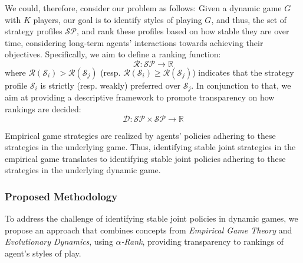         \noindent
        We could, therefore, consider our problem as follows: Given a dynamic game $G$ with $K$ players, our goal is to identify styles of playing $G$, and thus, the set of strategy profiles $\mathcal{SP}$, and rank these profiles based on how stable they are over time, considering long-term agents' interactions towards achieving their objectives. Specifically, we aim to define a ranking function:
        \begin{equation}
            \mathcal{R}: \mathcal{SP} \to \mathbb{R}
            \label{eq:ranking_function}
        \end{equation}
        where $\mathcal{R}(\mathcal{S}_i) > \mathcal{R}(\mathcal{S}_j)$ (resp. $\mathcal{R}(\mathcal{S}_i) \geq \mathcal{R}(\mathcal{S}_j)$) indicates that the strategy profile $\mathcal{S}_i$ is strictly (resp. weakly) preferred over $\mathcal{S}_j$. In conjunction to that, we aim at providing a descriptive framework to promote transparency on how rankings are decided:
        \begin{equation}
            \mathcal{D}: \mathcal{SP} \times \mathcal{SP} \to \mathbb{R}
            \label{eq:descriptive framework}
        \end{equation}

        \noindent
        Empirical game strategies are realized by agents' policies adhering to these strategies in the underlying game. Thus, identifying stable joint strategies in the empirical game translates to identifying stable joint policies adhering to these strategies in the underlying dynamic game.

    \subsubsection{Proposed Methodology}

        To address the challenge of identifying stable joint policies in dynamic games, we propose an approach that combines concepts from \emph{Empirical Game Theory} and \emph{Evolutionary Dynamics}, using \emph{$\alpha$-Rank}, providing transparency to rankings of agent's styles of play.\tinydouble

